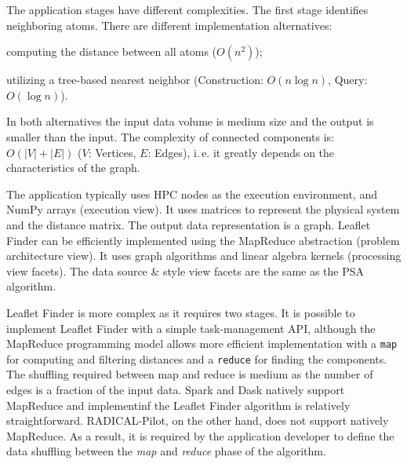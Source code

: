 The application stages have different complexities.
The first stage identifies neighboring atoms.
There are different implementation alternatives: 
\begin{inparaenum}[i)]
    \item computing the distance between all atoms ($O(n^2)$);
    \item utilizing a tree-based nearest neighbor (Construction: $O(n\log n)$, 
    Query: $O(\log n)$).
\end{inparaenum}
In both alternatives the input data volume is medium size and the output is smaller than the input.
The complexity of connected components is: $O(|V|+|E|)$ ($V$: Vertices, $E$: Edges), i.\,e. it greatly depends on the characteristics of the graph.

The application typically uses HPC nodes as the execution environment, and NumPy arrays (execution view).
It uses matrices to represent the physical system and the distance matrix.
The output data representation is a graph.
Leaflet Finder can be efficiently implemented using the MapReduce abstraction (problem architecture view).
It uses graph algorithms and linear algebra kernels (processing view facets).
The data source \& style view facets are the same as the PSA algorithm.

Leaflet Finder is more complex as it requires two stages.
It is possible to implement Leaflet Finder with a simple task-management API, although the MapReduce programming model allows more efficient implementation with a \texttt{map} for computing and filtering distances and a \texttt{reduce} for finding the components.
The shuffling required between map and reduce is medium as the number of edges is a fraction of the input data.
Spark and Dask natively support MapReduce and implementinf the Leaflet Finder algorithm is relatively straightforward.
RADICAL-Pilot, on the other hand, does not support natively MapReduce.
As a result, it is required by the application developer to define the data shuffling between the \emph{map} and \emph{reduce} phase of the algorithm.



